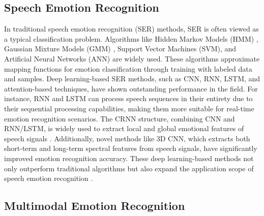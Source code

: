 \documentclass[preprint,12pt]{elsarticle}
\begin{document}
\subsection{Speech Emotion Recognition}

In traditional speech emotion recognition (SER) methods, SER is often viewed as a typical classification problem. Algorithms like Hidden Markov Models (HMM) \cite{ref15}, Gaussian Mixture Models (GMM) \cite{ref16}, Support Vector Machines (SVM), and Artificial Neural Networks (ANN) are widely used. These algorithms approximate mapping functions for emotion classification through training with labeled data and samples. Deep learning-based SER methods, such as CNN, RNN, LSTM, and attention-based techniques, have shown outstanding performance in the field. For instance, RNN and LSTM can process speech sequences in their entirety due to their sequential processing capabilities, making them more suitable for real-time emotion recognition scenarios. The CRNN structure, combining CNN and RNN/LSTM, is widely used to extract local and global emotional features of speech signals \cite{ref17}. Additionally, novel methods like 3D CNN, which extracts both short-term and long-term spectral features from speech signals, have significantly improved emotion recognition accuracy. These deep learning-based methods not only outperform traditional algorithms but also expand the application scope of speech emotion recognition \cite{ref18}.

\subsection{Multimodal Emotion Recognition}
\end{document}
